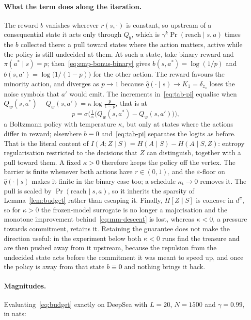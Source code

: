 \documentclass[11pt]{article}
\theoremstyle{remark}
\newcommand{\1}{\mathds{1}}
\newcommand{\occ}{d^{\pi}}
\newcommand{\Hf}[1]{H\!\left[#1\right]}
\newcommand{\fix}[1]{\textcolor{red!75!black}{#1}}
\begin{document}
\paragraph{What the term does along the iteration.}
The reward $b$ vanishes wherever $r(s,\cdot)$ is constant, so upstream of a consequential state it acts only through $Q_b$, which is $\gamma^{k}\Pr(\text{reach}\mid s,a)$ times the $b$ collected there: a pull toward states where the action matters, active while the policy is still undecided at them.
At such a state, take binary reward and $\pi(a^\ast\mid s)=p$; then~\eqref{eq:emp-bonus-binary} gives $b(s,a^\ast)=\log(1/p)$ and $b(s,a')=\log\big(1/(1-p)\big)$ for the other action.
The reward favours the minority action, and diverges as $p\to1$ because $\hat q(\cdot\mid s)\to K_1=\delta_{z_0}$ loses the noise symbols that $a'$ would emit.
The increments in~\eqref{eq:tab-pi} equalise when $Q_w(s,a^\ast)-Q_w(s,a')=\kappa\log\tfrac{p}{1-p}$, that is at
\begin{equation}
  p=\sigma\Big(\tfrac{1}{\kappa}\big(Q_w(s,a^\ast)-Q_w(s,a')\big)\Big),
  \label{eq:emp-temperature}
\end{equation}
a Boltzmann policy with temperature $\kappa$, but only at states where the actions differ in reward; elsewhere $b\equiv0$ and~\eqref{eq:tab-pi} separates the logits as before.
That is the literal content of $I(A;Z\mid S)=H(A\mid S)-H(A\mid S,Z)$: entropy regularisation restricted to the decisions that $Z$ can distinguish, together with a pull toward them.
A fixed $\kappa>0$ therefore keeps the policy off the vertex.
The barrier is finite whenever both actions have $r\in(0,1)$, and the $\varepsilon$-floor on $\hat q(\cdot\mid s)$ makes it finite in the binary case too; a schedule $\kappa_t\to0$ removes it.
The pull is scaled by $\Pr(\text{reach}\mid s,a)$, so it inherits the sparsity of Lemma~\ref{lem:budget} rather than escaping it.
Finally, $\Hf{Z\mid S}$ is concave in $\occ$, so for $\kappa>0$ the frozen-model surrogate is no longer a majorisation and the monotone improvement behind~\eqref{eq:mm-descent} is lost, whereas $\kappa<0$, a pressure towards commitment, retains it.\fix{ Retaining the guarantee does not make the direction useful: in the experiment below both $\kappa<0$ runs find the treasure and are then pushed away from it upstream, because the repulsion from the undecided state acts before the commitment it was meant to speed up, and once the policy is away from that state $b\equiv0$ and nothing brings it back.}

\paragraph{Magnitudes.}
Evaluating~\eqref{eq:budget} exactly on DeepSea with $L=20$, $N=1500$ and $\gamma=0.99$, in nats:
\end{document}
